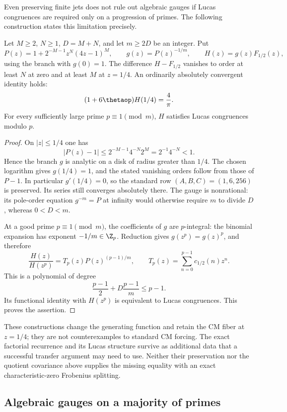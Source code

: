 Even preserving finite jets does not rule out algebraic gauges if
Lucas congruences are required only on a progression of primes.
The following construction states this limitation precisely.

\begin{proposition}\label{prop:C-algebraic-jet-lucas}
Let $M\geq2$, $N\geq1$, $D=M+N$, and let $m\geq2D$ be an integer.
Put
\[
 P(z)=1+2^{-M-1}z^N(4z-1)^M,\qquad
 g(z)=P(z)^{-1/m},\qquad H(z)=g(z)F_{1/2}(z),
\]
using the branch with $g(0)=1$.
The difference $H-F_{1/2}$ vanishes to order at least $N$ at zero
and at least $M$ at $z=1/4$. An ordinarily absolutely convergent
identity holds:
\[
 (1+6\thetaop)H(1/4)=\frac4\pi.
\]
For every sufficiently large prime $p\equiv1\pmod m$, $H$ satisfies
Lucas congruences modulo $p$.
\end{proposition}
\begin{proof}
On $|z|\leq1/4$ one has
\[
 |P(z)-1|\leq 2^{-M-1}4^{-N}2^M=2^{-1}4^{-N}<1.
\]
Hence the branch $g$ is analytic on a disk of radius greater than
$1/4$. The chosen logarithm gives $g(1/4)=1$, and the stated
vanishing orders follow from those of $P-1$.
In particular $g'(1/4)=0$, so the standard row $(A,B,C)=(1,6,256)$
is preserved.
Its series still converges absolutely there.
The gauge is nonrational: its pole-order equation $g^{-m}=P$ at
infinity would otherwise require $m$ to divide $D$, whereas $0<D<m$.

At a good prime $p\equiv1\pmod m$, the coefficients of $g$ are
$p$-integral: the binomial expansion has exponent $-1/m\in\Z_p$.
Reduction gives $g(z^p)=g(z)^p$, and therefore
\[
 \frac{H(z)}{H(z^p)}
 =T_p(z)P(z)^{(p-1)/m},\qquad
 T_p(z)=\sum_{n=0}^{p-1}c_{1/2}(n)z^n.
\]
This is a polynomial of degree
\[
 \frac{p-1}{2}+D\frac{p-1}{m}\leq p-1.
\]
Its functional identity with $H(z^p)$ is equivalent to Lucas
congruences. This proves the assertion.
\end{proof}

These constructions change the generating function and retain the CM
fiber at $z=1/4$; they are not counterexamples to standard CM forcing.
The exact factorial recurrence and its Lucas structure survive as
additional data that a successful transfer argument may need to use.
Neither their preservation nor the quotient covariance above supplies
the missing equality with an exact characteristic-zero Frobenius
splitting.

\subsection{Algebraic gauges on a majority of primes}
\label{subsec:C-majority-lucas-gauges}

